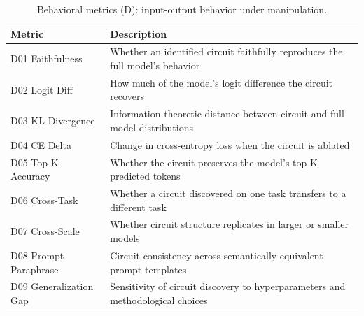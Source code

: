 \documentclass[10pt]{article}
\begin{document}
\begin{table}[H]
\centering
\small
\caption{Behavioral metrics (D): input-output behavior under manipulation.}
\renewcommand{\arraystretch}{1.12}
\begin{tabular}{@{}lp{10cm}@{}}
\toprule
\textbf{Metric} & \textbf{Description} \\
\midrule
D01 Faithfulness & Whether an identified circuit faithfully reproduces the full model's behavior \\
D02 Logit Diff & How much of the model's logit difference the circuit recovers \\
D03 KL Divergence & Information-theoretic distance between circuit and full model distributions \\
D04 CE Delta & Change in cross-entropy loss when the circuit is ablated \\
D05 Top-K Accuracy & Whether the circuit preserves the model's top-K predicted tokens \\
D06 Cross-Task & Whether a circuit discovered on one task transfers to a different task \\
D07 Cross-Scale & Whether circuit structure replicates in larger or smaller models \\
D08 Prompt Paraphrase & Circuit consistency across semantically equivalent prompt templates \\
D09 Generalization Gap & Sensitivity of circuit discovery to hyperparameters and methodological choices \\
\bottomrule
\end{tabular}
\end{table}
\end{document}
